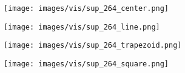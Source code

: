\documentclass[10pt,twocolumn,letterpaper]{article}
\begin{document}
\begin{figure*}[t]
        \begin{subfigure}[b]{0.23\textwidth}
  \texttt{[image: images/vis/sup\_264\_center.png]}
    \end{subfigure}%
    \begin{subfigure}[b]{0.23\textwidth}
  \texttt{[image: images/vis/sup\_264\_line.png]}
    \end{subfigure}%
    \begin{subfigure}[b]{0.23\textwidth}
  \texttt{[image: images/vis/sup\_264\_trapezoid.png]}
    \end{subfigure}%
    \begin{subfigure}[b]{0.23\textwidth}
  \texttt{[image: images/vis/sup\_264\_square.png]}
    \end{subfigure}%


\end{figure*}
\end{document}

